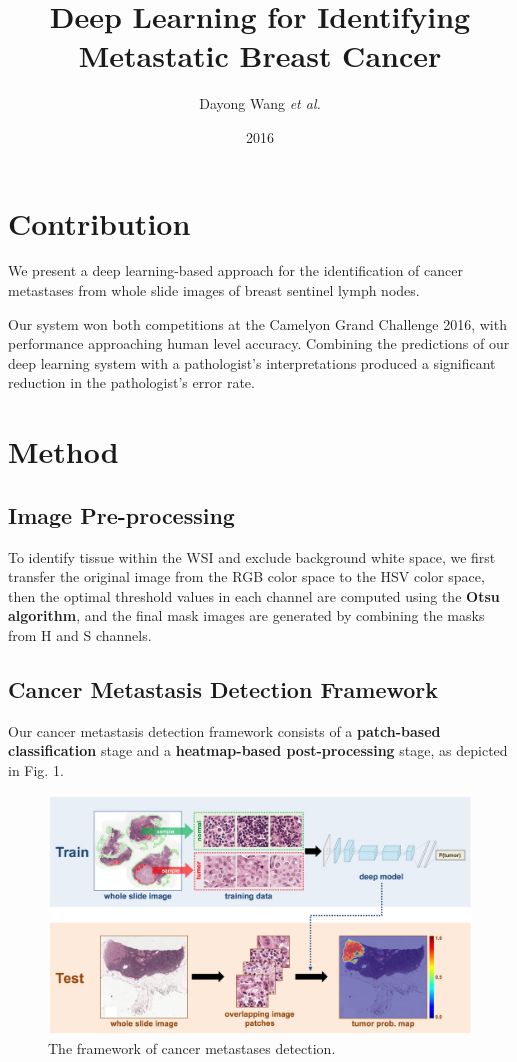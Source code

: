\documentclass[a4paper,12pt]{article}
\title{Deep Learning for Identifying Metastatic Breast Cancer}
\author{Dayong Wang \emph{et al.}}
\date{2016}
\begin{document}
\maketitle

\section{Contribution}

We present a deep learning-based approach for the identification of cancer metastases from whole slide images of breast sentinel lymph nodes.

Our system won both competitions at the Camelyon Grand Challenge 2016, with performance approaching human level accuracy. Combining the predictions of our deep learning system with a pathologist’s interpretations produced a significant reduction in the pathologist’s error rate.

\section{Method}

\subsection{Image Pre-processing}

To identify tissue within the WSI and exclude background white space, we first transfer the original image from the RGB color space to the HSV color space, then the optimal threshold values in each channel are computed using the \textbf{Otsu algorithm}, and the final mask images are generated by combining the masks from H and S channels.

\subsection{Cancer Metastasis Detection Framework}

Our cancer metastasis detection framework consists of a \textbf{patch-based classification} stage and a \textbf{heatmap-based post-processing} stage, as depicted in Fig. 1.

\begin{figure}[ht]
	\includegraphics[width=\columnwidth]{img/metastasis-framework.jpg}
	\caption{The framework of cancer metastases detection.}
\end{figure}
\end{document}

